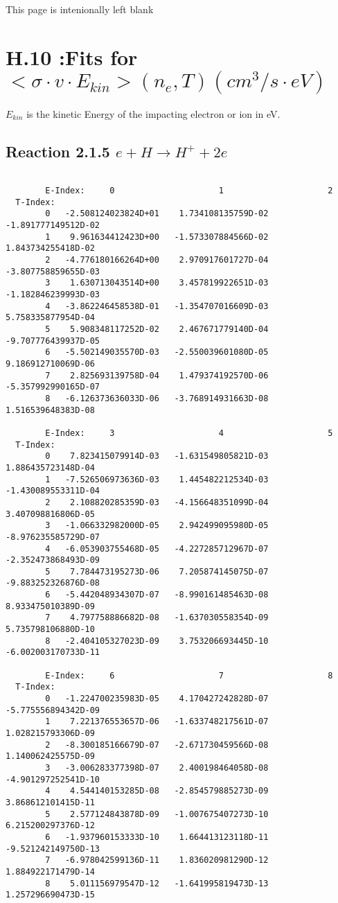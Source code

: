 \newpage
This page is intenionally left blank
\newpage
\section{H.10 :Fits for $<\sigma \cdot v \cdot E_{kin}> (n_e,T)
(cm^3/s \cdot eV)$}

$E_{kin}$ is the kinetic Energy of the impacting electron or ion in eV.

\subsection{
Reaction 2.1.5  $ e + H \rightarrow H^+ + 2e $
}




\begin{verbatim}

        E-Index:     0                     1                     2
  T-Index:
        0   -2.508124023824D+01    1.734108135759D-02   -1.891777149512D-02
        1    9.961634412423D+00   -1.573307884566D-02    1.843734255418D-02
        2   -4.776180166264D+00    2.970917601727D-04   -3.807758859655D-03
        3    1.630713043514D+00    3.457819922651D-03   -1.182846239993D-03
        4   -3.862246458538D-01   -1.354707016609D-03    5.758335877954D-04
        5    5.908348117252D-02    2.467671779140D-04   -9.707776439937D-05
        6   -5.502149035570D-03   -2.550039601080D-05    9.186912710069D-06
        7    2.825693139758D-04    1.479374192570D-06   -5.357992990165D-07
        8   -6.126373636033D-06   -3.768914931663D-08    1.516539648383D-08

        E-Index:     3                     4                     5
  T-Index:
        0    7.823415079914D-03   -1.631549805821D-03    1.886435723148D-04
        1   -7.526506973636D-03    1.445482212534D-03   -1.430089553311D-04
        2    2.108820285359D-03   -4.156648351099D-04    3.407098816806D-05
        3   -1.066332982000D-05    2.942499095980D-05   -8.976235585729D-07
        4   -6.053903755468D-05   -4.227285712967D-07   -2.352473868493D-09
        5    7.784473195273D-06    7.205874145075D-07   -9.883252326876D-08
        6   -5.442048934307D-07   -8.990161485463D-08    8.933475010389D-09
        7    4.797758886682D-08   -1.637030558354D-09    5.735798106880D-10
        8   -2.404105327023D-09    3.753206693445D-10   -6.002003170733D-11

        E-Index:     6                     7                     8
  T-Index:
        0   -1.224700235983D-05    4.170427242828D-07   -5.775556894342D-09
        1    7.221376553657D-06   -1.633748217561D-07    1.028215793306D-09
        2   -8.300185166679D-07   -2.671730459566D-08    1.140062425575D-09
        3   -3.006283377398D-07    2.400198464058D-08   -4.901297252541D-10
        4    4.544140153285D-08   -2.854579885273D-09    3.868612101415D-11
        5    2.577124843878D-09   -1.007675407273D-10    6.215200297376D-12
        6   -1.937960153333D-10    1.664413123118D-11   -9.521242149750D-13
        7   -6.978042599136D-11    1.836020981290D-12    1.884922171479D-14
        8    5.011156979547D-12   -1.641995819473D-13    1.257296690473D-15


\end{verbatim}

